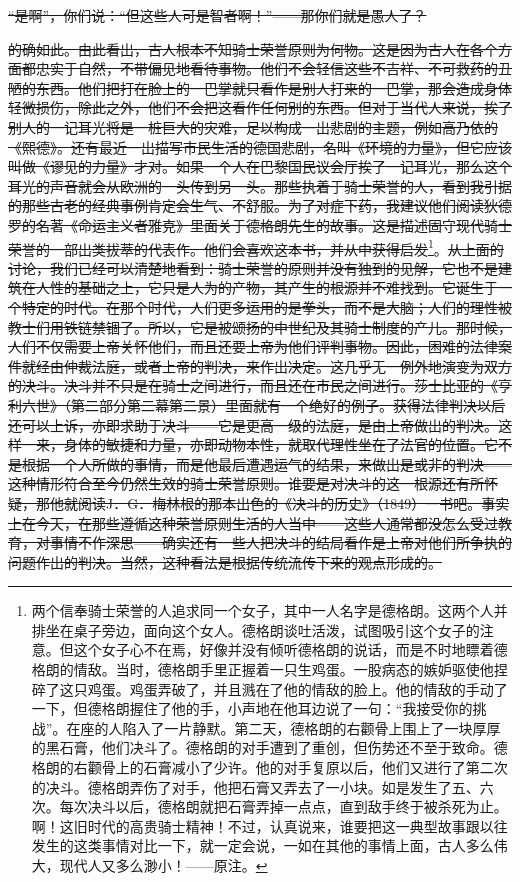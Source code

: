 \documentclass[12pt,oneside]{book}
\begin{document}
\sout{“是啊”，你们说：“但这些人可是智者啊！”——那你们就是愚人了？ }

\sout{的确如此。由此看出，古人根本不知骑士荣誉原则为何物。这是因为古人在各个方面都忠实于自然，不带偏见地看待事物。他们不会轻信这些不吉祥、不可救药的丑陋的东西。他们把打在脸上的一巴掌就只看作是别人打来的一巴掌，那会造成身体轻微损伤，除此之外，他们不会把这看作任何别的东西。但对于当代人来说，挨了别人的一记耳光将是一桩巨大的灾难，足以构成一出悲剧的主题，例如高乃依的《熙德》。还有最近一出描写市民生活的德国悲剧，名叫《环境的力量》，但它应该叫做《谬见的力量》才对。如果一个人在巴黎国民议会厅挨了一记耳光，那么这个耳光的声音就会从欧洲的一头传到另一头。那些执着于骑士荣誉的人，看到我引据的那些古老的经典事例肯定会生气、不舒服。为了对症下药，我建议他们阅读狄德罗的名著《命运主义者雅克》里面关于德格朗先生的故事。这是描述固守现代骑士荣誉的一部出类拔萃的代表作。他们会喜欢这本书，并从中获得启发}\footnote{两个信奉骑士荣誉的人追求同一个女子，其中一人名字是德格朗。这两个人并排坐在桌子旁边，面向这个女人。德格朗谈吐活泼，试图吸引这个女子的注意。但这个女子心不在焉，好像并没有倾听德格朗的说话，而是不时地瞟着德格朗的情敌。当时，德格朗手里正握着一只生鸡蛋。一股病态的嫉妒驱使他捏碎了这只鸡蛋。鸡蛋弄破了，并且溅在了他的情敌的脸上。他的情敌的手动了一下，但德格朗握住了他的手，小声地在他耳边说了一句：“我接受你的挑战”。在座的人陷入了一片静默。第二天，德格朗的右颧骨上围上了一块厚厚的黑石膏，他们决斗了。德格朗的对手遭到了重创，但伤势还不至于致命。德格朗的右颧骨上的石膏减小了少许。他的对手复原以后，他们又进行了第二次的决斗。德格朗弄伤了对手，他把石膏又弄去了一小块。如是发生了五、六次。每次决斗以后，德格朗就把石膏弄掉一点点，直到敌手终于被杀死为止。啊！这旧时代的高贵骑士精神！不过，认真说来，谁要把这一典型故事跟以往发生的这类事情对比一下，就一定会说，一如在其他的事情上面，古人多么伟大，现代人又多么渺小！——原注。}。\sout{从上面的讨论，我们已经可以清楚地看到：骑士荣誉的原则并没有独到的见解，它也不是建筑在人性的基础之上，它只是人为的产物，其产生的根源并不难找到。它诞生于一个特定的时代。在那个时代，人们更多运用的是拳头，而不是大脑；人们的理性被教士们用铁链禁锢了。所以，它是被颂扬的中世纪及其骑士制度的产儿。那时候，人们不仅需要上帝关怀他们，而且还要上帝为他们评判事物。因此，困难的法律案件就经由仲裁法庭，或者上帝的判决，来作出决定。这几乎无一例外地演变为双方的决斗。决斗并不只是在骑士之间进行，而且还在市民之间进行。莎士比亚的《亨利六世》（第二部分第二幕第二景）里面就有一个绝好的例子。获得法律判决以后还可以上诉，亦即求助于决斗——它是更高一级的法庭，是由上帝做出的判决。这样一来，身体的敏捷和力量，亦即动物本性，就取代理性坐在了法官的位置。它不是根据一个人所做的事情，而是他最后遭遇运气的结果，来做出是或非的判决——这种情形符合至今仍然生效的骑士荣誉原则。谁要是对决斗的这一根源还有所怀疑，那他就阅读J．G．梅林根的那本出色的《决斗的历史》（1849）一书吧。事实上在今天，在那些遵循这种荣誉原则生活的人当中——这些人通常都没怎么受过教育，对事情不作深思——确实还有一些人把决斗的结局看作是上帝对他们所争执的问题作出的判决。当然，这种看法是根据传统流传下来的观点形成的。 }
\end{document}
